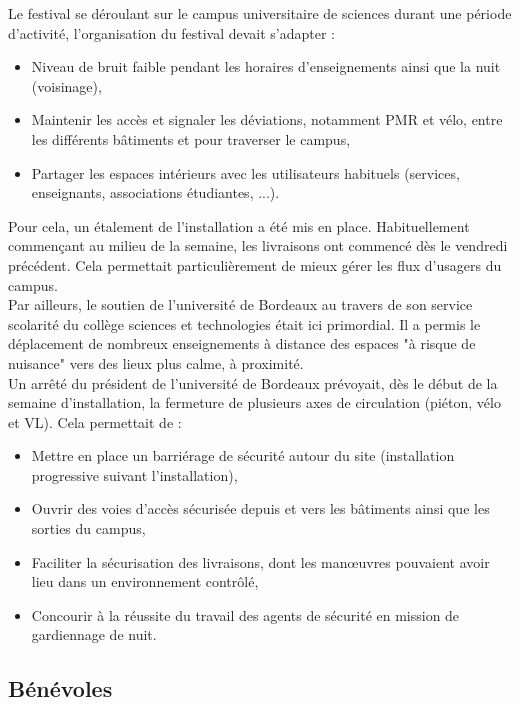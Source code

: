 \documentclass[12pt,a4paper]{report}
\begin{document}
Le festival se déroulant sur le campus universitaire de sciences durant une période d'activité, l'organisation du festival devait s'adapter : 
\begin{itemize}
\item Niveau de bruit faible pendant les horaires d'enseignements ainsi que la nuit (voisinage),
\item Maintenir les accès et signaler les déviations, notamment PMR et vélo, entre les différents bâtiments et pour traverser le campus,
\item Partager les espaces intérieurs avec les utilisateurs habituels (services, enseignants, associations étudiantes, ...).\\
\end{itemize}

Pour cela, un étalement de l'installation a été mis en place. Habituellement commençant au milieu de la semaine, les livraisons ont commencé dès le vendredi précédent. Cela permettait particulièrement de mieux gérer les flux d'usagers du campus.\\

Par ailleurs, le soutien de l'université de Bordeaux au travers de son service scolarité du collège sciences et technologies était ici primordial. Il a permis le déplacement de nombreux enseignements à distance des espaces "à risque de nuisance" vers des lieux plus calme, à proximité.\\

Un arrêté du président de l'université de Bordeaux prévoyait, dès le début de la semaine d'installation, la fermeture de plusieurs axes de circulation (piéton, vélo et VL). Cela permettait de :
\begin{itemize}
\item Mettre en place un barriérage de sécurité autour du site (installation progressive suivant l'installation),
\item Ouvrir des voies d'accès sécurisée depuis et vers les bâtiments ainsi que les sorties du campus,
\item Faciliter la sécurisation des livraisons, dont les manœuvres pouvaient avoir lieu dans un environnement contrôlé,
\item Concourir à la réussite du travail des agents de sécurité en mission de gardiennage de nuit.\\
\end{itemize}

\subsection{Bénévoles}
\end{document}
